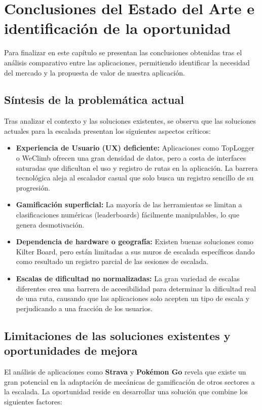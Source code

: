 \section{Conclusiones del Estado del Arte e identificación de la oportunidad}
 
Para finalizar en este capítulo se presentan las conclusiones obtenidas tras el análisis comparativo entre las aplicaciones, permitiendo identificar la necesidad del mercado y la propuesta de valor de nuestra aplicación.

\subsection{Síntesis de la problemática actual}

Tras analizar el contexto y las soluciones existentes, se observa que las soluciones actuales para la escalada presentan los siguientes aspectos críticos:

\begin{itemize}
\item \textbf{Experiencia de Usuario (UX) deficiente:} Aplicaciones como TopLogger o WeClimb ofrecen una gran densidad de datos, pero a costa de interfaces saturadas que dificultan el uso y registro de rutas en la aplicación. La barrera tecnológica aleja al escalador casual que solo busca un registro sencillo de su progresión.
\item \textbf{Gamificación superficial:} La mayoría de las herramientas se limitan a clasificaciones numéricas (leaderboards) fácilmente manipulables, lo que genera desmotivación.
\item \textbf{Dependencia de hardware o geografía:} Existen buenas soluciones como Kilter Board, pero están limitadas a sus muros de escalada específicos dando como resultado un registro parcial de las sesiones de escalada.
\item \textbf{Escalas de dificultad no normalizadas:} La gran variedad de escalas diferentes crea una barrera de accesibilidad para determinar la dificultad real de una ruta, causando que las aplicaciones solo acepten un tipo de escala y perjudicando a una fracción de los usuarios.
\end{itemize}

\subsection{Limitaciones de las soluciones existentes y oportunidades de mejora}

El análisis de aplicaciones como \textbf{Strava} y \textbf{Pokémon Go} revela que existe un gran potencial en la adaptación de mecánicas de gamificación de otros sectores a la escalada. La oportunidad reside en desarrollar una solución que combine los siguientes factores:

